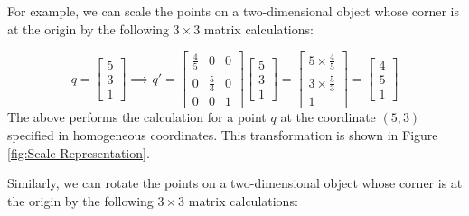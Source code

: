 \documentclass[
    12pt,
    twoside,
    bibstyle=chicago,
    headerstyle=uppercase,
	bibfile=biblatex_updating.bib
]{reedthesis}
\begin{document}
For example, we can scale the points on a two-dimensional object whose corner is at the origin by the following $3\times3$ matrix calculations:

\[q = \begin{bmatrix}5\\3\\1\end{bmatrix} \implies q' = \begin{bmatrix}\frac{4}{5}&0&0\\0&\frac{5}{3}&0\\0&0&1\end{bmatrix}\begin{bmatrix}5\\3\\1\end{bmatrix} = \begin{bmatrix}5 \times \frac{4}{5}\\3 \times \frac{5}{3}\\1\end{bmatrix}= \begin{bmatrix}4\\5\\1\end{bmatrix}\]
The above performs the calculation for a point $q$ at the coordinate $(5,3)$ specified in homogeneous coordinates. This transformation is shown in Figure \ref{fig:Scale Representation}.

Similarly, we can rotate the points on a two-dimensional object whose corner is at the origin by the following $3\times3$ matrix calculations:
\end{document}
